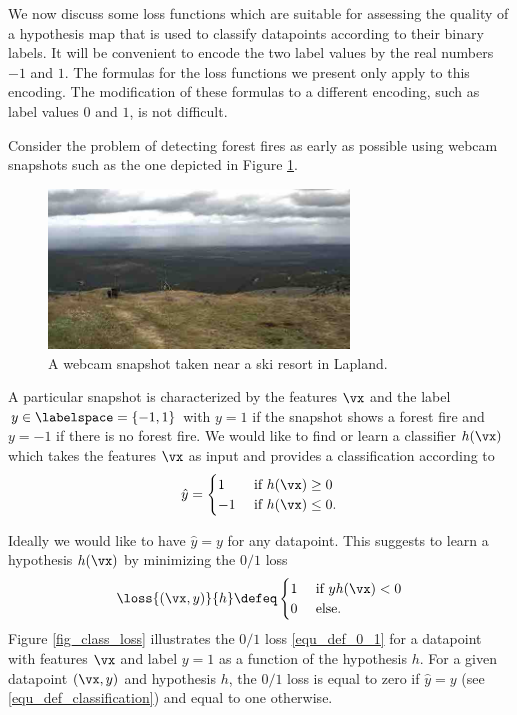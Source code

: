 \documentclass[12pt]{report}
\begin{document}
We now discuss some loss functions which are suitable for 
assessing the quality of a hypothesis map that is 
used to classify datapoints according to their binary labels. 
It will be convenient to encode the two label values by the real 
numbers $-1$ and $1$. 
The formulas for the loss functions we present only apply to 
this encoding. The modification of these formulas to a different 
encoding, such as label values $0$ and $1$, is not difficult. 

Consider the problem of detecting forest fires as early as possible 
using webcam snapshots such as the one depicted in Figure \ref{fig:webcam_forestfire}. 
\begin{figure}[htbp]
\begin{center}
\includegraphics[width=8cm]{WebcamLapland.jpg}  
\caption{A webcam snapshot taken near a ski resort in Lapland.}
\label{fig:webcam_forestfire}
\end{center}
\end{figure}
A particular snapshot is characterized by the features $\vx$ and 
the label $y \in \labelspace=\{-1,1\}$ with $y=1$ if the snapshot 
shows a forest fire and $y=-1$ if there is no forest fire. We would 
like to find or learn a classifier $h(\vx)$ which takes the features $\vx$ 
as input and provides a classification according to 
\begin{equation} 
\label{equ_def_classification}
\hat{y} =  \begin{cases} 1 & \mbox{ if } h(\vx) \geq 0 \\ 
-1 & \mbox{ if } h(\vx) \leq 0. \end{cases} 
\end{equation} 

Ideally we would like to have $\hat{y} = y$ for any datapoint. 
This suggests to learn a hypothesis $h(\vx)$ by minimizing 
the $0/1$ loss
\begin{equation}
\label{equ_def_0_1}
\loss{(\vx,y)}{h} \defeq \begin{cases} 1 &\mbox{ if } y h(\vx) < 0 \\ 0 & \mbox{ else.} \end{cases}
\end{equation} 
Figure \ref{fig_class_loss} illustrates the $0/1$ loss \eqref{equ_def_0_1} 
for a datapoint with features $\vx$ and label $y=1$ as a function of 
the hypothesis $h$. For a given datapoint $(\vx,y)$ and hypothesis 
$h$, the $0/1$ loss is equal to zero if $\hat{y}=y$ (see \eqref{equ_def_classification}) 
and equal to one otherwise. 
\end{document}
